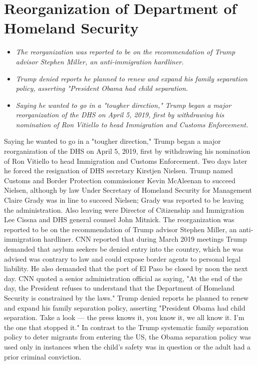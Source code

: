 \section{Reorganization of Department of Homeland
Security}\label{reorganization-of-department-of-homeland-security}

\begin{itemize}
\item
  \emph{The reorganization was reported to be on the recommendation of
  Trump advisor Stephen Miller, an anti-immigration hardliner.}
\item
  \emph{Trump denied reports he planned to renew and expand his family
  separation policy, asserting "President Obama had child separation.}
\item
  \emph{Saying he wanted to go in a "tougher direction," Trump began a
  major reorganization of the DHS on April 5, 2019, first by withdrawing
  his nomination of Ron Vitiello to head Immigration and Customs
  Enforcement.}
\end{itemize}

Saying he wanted to go in a "tougher direction," Trump began a major
reorganization of the DHS on April 5, 2019, first by withdrawing his
nomination of Ron Vitiello to head Immigration and Customs Enforcement.
Two days later he forced the resignation of DHS secretary Kirstjen
Nielsen. Trump named Customs and Border Protection commissioner Kevin
McAleenan to succeed Nielsen, although by law Under Secretary of
Homeland Security for Management Claire Grady was in line to succeed
Nielsen; Grady was reported to be leaving the administration. Also
leaving were Director of Citizenship and Immigration Lee Cissna and DHS
general counsel John Mitnick. The reorganization was reported to be on
the recommendation of Trump advisor Stephen Miller, an anti-immigration
hardliner. CNN reported that during March 2019 meetings Trump demanded
that asylum seekers be denied entry into the country, which he was
advised was contrary to law and could expose border agents to personal
legal liability. He also demanded that the port of El Paso be closed by
noon the next day. CNN quoted a senior administration official as
saying, "At the end of the day, the President refuses to understand that
the Department of Homeland Security is constrained by the laws." Trump
denied reports he planned to renew and expand his family separation
policy, asserting "President Obama had child separation. Take a look ---
the press knows it, you know it, we all know it. I'm the one that
stopped it." In contrast to the Trump systematic family separation
policy to deter migrants from entering the US, the Obama separation
policy was used only in instances when the child's safety was in
question or the adult had a prior criminal conviction.

